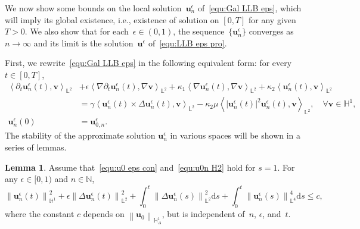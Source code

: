 \documentclass[11pt,reqno]{amsart}
\theoremstyle{definition}
\newtheorem{lemma}[theorem]{Lemma}
\numberwithin{equation}{section}
\newcommand{\bff}{\boldsymbol}
\newcommand{\bb}{\mathbb}
\newcommand{\ds}{\mathrm{d}s}
\newcommand{\pa}{\partial}
\newcommand{\nn}{\nonumber}
\newcommand{\norm}[2]{\left\|{#1}\right\|_{#2}}
\newcommand{\inpro}[2]{\left\langle#1,#2\right\rangle}
\begin{document}
We now show some bounds on the local solution~$\bff{u}_n^\epsilon$
of~\eqref{equ:Gal LLB eps}, which will imply its global existence, i.e., existence of solution on $[0,T]$ for any given $T>0$. We also show that
for each~$\epsilon\in (0,1)$, the sequence~$\{\bff{u}_n^{\epsilon}\}$ converges as $n\to\infty$
and its limit is the solution~$\bff{u}^\epsilon$ of~\eqref{equ:LLB eps pro}.




First, we rewrite~\eqref{equ:Gal LLB eps} in the following equivalent form: for
every~$t\in [0,T]$,
\begin{subequations}\label{equ:LLB eps wea}
	\begin{alignat}{1}
		\inpro{\pa_t\bff{u}_n^\epsilon(t)}{\bff{v}}_{\bb{L}^2}
		&+
		\epsilon \inpro{\nabla\pa_t \bff{u}_n^\epsilon(t)}{\nabla\bff{v}}_{\bb{L}^2}
		+
		\kappa_1 \inpro{\nabla\bff{u}_n^\epsilon(t)}{\nabla\bff{v}}_{\bb{L}^2}
		+
		\kappa_2
		\inpro{\bff{u}_n^\epsilon(t)}{\bff{v}}_{\bb{L}^2}
		\nn\\
		&=
		\gamma
		\inpro{\bff{u}_n^\epsilon(t)\times\Delta\bff{u}_n^\epsilon(t)}{ \bff{v}}_{\bb{L}^2}
		-
		\kappa_2 \mu
		\inpro{|\bff{u}_n^\epsilon(t)|^2 \bff{u}_n^\epsilon(t)}{\bff{v}}_{\bb{L}^2},
		\quad \forall\bff{v}\in\bb{H}^1,
		\label{equ:LLB eps wea equ}
		\\
		\bff{u}_n^\epsilon(0) &= \bff{u}^\epsilon_{0,n}.
		\label{equ:LLB eps wea con}
	\end{alignat}
\end{subequations}
The stability of the approximate solution $\bff{u}_n^\epsilon$ in various spaces will be shown in a series of lemmas.
\begin{lemma}\label{lem:ene est 1}
	Assume that~\eqref{equ:u0 eps con} and~\eqref{equ:u0n H2} hold for $s=1$. For any $\epsilon\in [0,1)$ and
	$n\in \bb{N}$,
\begin{equation}\label{equ:un H1 H2}
\norm{\bff{u}^\epsilon_n(t)}{\bb{H}^1}^2
+
\epsilon \norm{\Delta\bff{u}^\epsilon_n(t)}{\bb{L}^2}^2
+
\int_0^t \norm{\Delta\bff{u}^\epsilon_n(s)}{\bb{L}^2}^2 \ds
+
\int_0^t 
\norm{\bff{u}^\epsilon_n(s)}{\bb{L}^4}^4 \ds
\le c,
\end{equation}
where the constant $c$ depends on $\norm{\bff{u}_0}{\bb{H}^1_\Delta}$, but is independent of~$n$, $\epsilon$, and~$t$.
\end{lemma}
\end{document}
